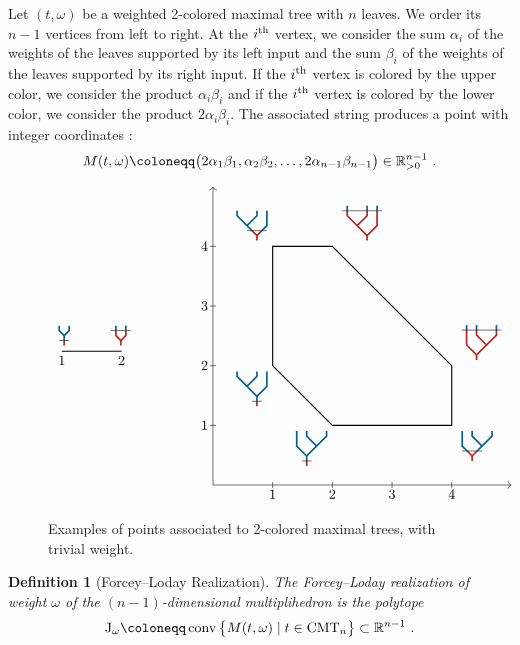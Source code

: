 \documentclass[twoside, 12pt]{amsart}
\newtheorem{definition}{Definition}[section]
\theoremstyle{remark}
\begin{document}
Let $(t, \omega)$ be a weighted 2-colored maximal tree with $n$ leaves. We order its $n-1$ vertices from left to right. At the $i^{\rm th}$ vertex, we consider the sum $\alpha_i$ of the weights of the leaves supported by its left input and 
 the sum $\beta_i$ of the weights of the leaves supported by its right input. 
If the $i^{\rm th}$ vertex is colored by the upper color, we consider the product $\alpha_i\beta_i$ and if the 
$i^{\rm th}$ vertex is colored by the lower color, we consider the product $2\alpha_i\beta_i$.
The associated string produces a point with integer coordinates :
\[M(t, \omega) \coloneqq \big(2\alpha_1\beta_1, \alpha_2\beta_2, \ldots, 2\alpha_{n-1}\beta_{n-1}\big)\in 
\RR_{>0}^{n-1}\ . \]
\begin{figure}[h!]
\[
\vcenter{\hbox{\begin{tikzpicture}[scale=1.5]
\draw[thick] (1,0)--(2,0);
\draw (1,0) node[above] {$\TreeBa$};
\draw (1.95,0) node[above] {$\TreeBb$};
\draw (1,0) node[below] {$1$};
\draw (2,0) node[below] {$2$};
\end{tikzpicture}}} \qquad \qquad
\vcenter{\hbox{
\begin{tikzpicture}[scale=1.5]
\draw (1,-0.05)--(1,0.05);
\draw (2,-0.05)--(2,0.05);
\draw (3,-0.05)--(3,0.05);
\draw (4,-0.05)--(4,0.05);
\draw (-0.05, 1)--(0.05,1);
\draw (-0.05, 2)--(0.05,2);
\draw (-0.05, 3)--(0.05,3);
\draw (-0.05, 4)--(0.05,4);
\draw[->] (0,0)--(5,0);
\draw[->] (0,0)--(0,5);
\draw (1,0) node[below] {$1$};
\draw (2,0) node[below] {$2$};
\draw (3,0) node[below] {$3$};
\draw (4,0) node[below] {$4$};
\draw (0,1) node[left] {$1$};
\draw (0,2) node[left] {$2$};
\draw (0,3) node[left] {$3$};
\draw (0,4) node[left] {$4$};
\draw[thick] (1,2)--(1,4)--(2,4)--(4,2)--(4,1)--(2,1)--cycle;
\draw (1,2) node[below left] {$\TreeLa$};
\draw (2,1) node[below left] {$\TreeRa$};
\draw (2,4) node[above right] {$\TreeLc$};
\draw (4,2) node[above right] {$\TreeRc$};
\draw (1,4) node[above left] {$\TreeLb$};
\draw (4,1) node[below right] {$\TreeRb$};
\end{tikzpicture}}}
\]
\caption{Examples of points associated to 2-colored maximal trees, with trivial weight.}
\end{figure}


\begin{definition}[Forcey--Loday Realization] \label{def:ForceyLoday}
 The \emph{Forcey--Loday realization of weight $\omega$} of the $(n-1)$-dimensional multiplihedron is the  polytope
\[\J_\omega \coloneqq \conv \big\{M(t, \omega)\mid t\in \CMT{n} \big\}\subset \RR^{n-1}\ .\]
\end{definition}
\end{document}
